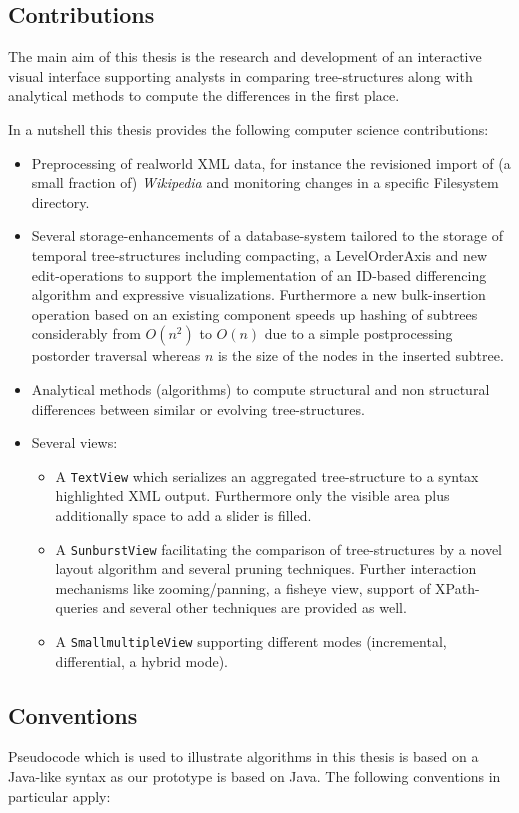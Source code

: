 \subsection{Contributions}
The main aim of this thesis is the research and development of an interactive visual interface supporting analysts in comparing tree-structures along with analytical methods to compute the differences in the first place.

In a nutshell this thesis provides the following computer science contributions:

\begin{itemize}
\item Preprocessing of realworld XML data, for instance the revisioned import of (a small fraction of) \emph{Wikipedia} and monitoring changes in a specific Filesystem directory.
\item Several storage-enhancements of a database-system tailored to the storage of temporal tree-structures including compacting, a LevelOrderAxis and new edit-operations to support the implementation of an ID-based differencing algorithm and expressive visualizations. Furthermore a new bulk-insertion operation based on an existing component speeds up hashing of subtrees considerably from $O(n^2)$ to $O(n)$ due to a simple postprocessing postorder traversal whereas $n$ is the size of the nodes in the inserted subtree.
\item Analytical methods (algorithms) to compute structural and non structural differences between similar or evolving tree-structures.
\item Several views:
\begin{itemize}
\item A \texttt{TextView} which serializes an aggregated tree-structure to a syntax highlighted XML output. Furthermore only the visible area plus additionally space to add a slider is filled.
\item A \texttt{SunburstView} facilitating the comparison of tree-structures by a novel layout algorithm and several pruning techniques. Further interaction mechanisms like zooming/panning, a fisheye view, support of XPath-queries and several other techniques are provided as well.
\item A \texttt{SmallmultipleView} supporting different modes (incremental, differential, a hybrid mode).
\end{itemize}
\end{itemize}

\subsection{Conventions}
Pseudocode which is used to illustrate algorithms in this thesis is based on a Java-like syntax as our prototype is based on Java. The following conventions in particular apply:


